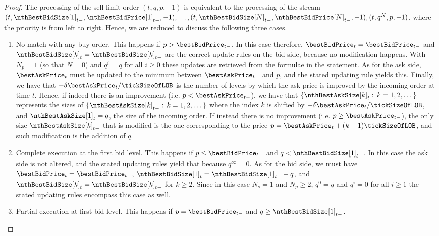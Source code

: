 \begin{proof}
 The processing of the sell limit order $(t,q,p,-1)$ is equivalent to the processing of the stream
 $(t,\nthBestBidSize[1]_{t-},\nthBestBidPrice[1]_{t-},-1), \dots, (t,\nthBestBidSize[N]_{t-},\nthBestBidPrice[N]_{t-},-1), (t,q^{N}, p, -1)$,
 where the priority is from left to right.
 Hence, we are reduced to discuss the following three cases.
 \begin{enumerate}[label={\emph{\roman{*}}.}]
  \item No match with any buy order.
  This happens if $p>\bestBidPrice_{t-}$.
  In this case therefore,
  $\bestBidPrice_t = \bestBidPrice_{t-}$ and $\nthBestBidSize[k]_{t} = \nthBestBidSize[k]_{t-}$
  are the correct update rules on the bid side, because no modification happens.
  With $N_p=1$ (so that $N=0$) and $q^i=q$ for all $i\geq 0$
  these updates are retrieved from the formulae in the statement.
  As for the ask side,
  $\bestAskPrice_t$ must be updated to the minimum between $\bestAskPrice_{t-}$ and $p$,
  and the stated updating rule yields this.
  Finally, we have that $-\delta\bestAskPrice_t/\tickSizeOfLOB$ is the number of levels
  by which the ask price is improved by the incoming order at time $t$.
  Hence, if indeed there is an improvement (i.e. $p<\bestAskPrice_{t-}$),
  we have that $\lbrace \nthBestAskSize[k]_{t}: \, k=1,2,\dots\rbrace$
  represents the sizes of $\lbrace \nthBestAskSize[k]_{t-}: \, k=1,2,\dots\rbrace$
  where the index $k$ is shifted by $-\delta\bestAskPrice_t/\tickSizeOfLOB$,
  and $\nthBestAskSize[1]_t = q$, the size of the incoming order.
  If instead there is no improvement (i.e. $p\geq \bestAskPrice_{t-}$),
  the only size $\nthBestAskSize[k]_{t-}$ that is modified
  is the one corresponding to the price $p=\bestAskPrice_t + (k-1)\tickSizeOfLOB$,
  and such modification is the addition of $q$.
  \item Complete execution at the first bid level.
  This happens if $p\leq\bestBidPrice_{t-}$ and $q<\nthBestBidSize[1]_{t-}$.
  In this case the ask side is not altered,
  and the stated updating rules yield that because $q^{\infty}=0$.
  As for the bid side, we must have
  $\bestBidPrice_t=\bestBidPrice_{t-}$,
  $\nthBestBidSize[1]_t = \nthBestBidSize[1]_{t-}- q$,
  and $\nthBestBidSize[k]_t = \nthBestBidSize[k]_{t-}$ for $k\geq 2$.
  Since in this case $N_s=1$ and $N_p\geq 2 $, $q^0 = q$ and $q^i = 0$ for all $i\geq 1$
  the stated updating rules encompass this case as well.
  \item Partial execution at first bid level.
  This happens if $p=\bestBidPrice_{t-}$ and $q\geq \nthBestBidSize[1]_{t-}$.

\end{enumerate}
\end{proof}
